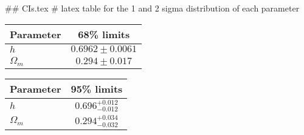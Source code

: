 ## CIs.tex
# latex table for the 1 and 2 sigma distribution of each parameter

\begin{tabular} { l  c}
 Parameter &  68\% limits\\
\hline
{\boldmath$h              $} & $0.6962\pm 0.0061          $\\
{\boldmath$\Omega_m       $} & $0.294\pm 0.017            $\\
\hline
\end{tabular}

\begin{tabular} { l  c}
 Parameter &  95\% limits\\
\hline
{\boldmath$h              $} & $0.696^{+0.012}_{-0.012}   $\\
{\boldmath$\Omega_m       $} & $0.294^{+0.034}_{-0.032}   $\\
\hline
\end{tabular}
